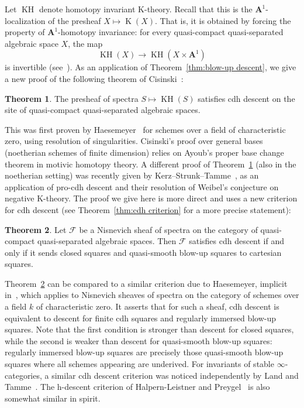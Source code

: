\documentclass[11pt]{article}
\theoremstyle{definition}
\numberwithin{equation}{section}
\numberwithin{figure}{section}
\numberwithin{table}{section}
\newtheorem{thmX}{Theorem}
\newcommand{\sF}{\ensuremath{\mathcal{F}}\xspace}
\newcommand{\bA}{\ensuremath{\mathbf{A}}\xspace}
\newcommand{\A}{\bA}
\DeclareMathOperator{\K}{K}
\DeclareMathOperator{\KH}{KH}
\begin{document}
Let $\KH$ denote homotopy invariant K-theory. Recall that this is the $\A^1$-localization of the presheaf $X \mapsto \K(X)$. That is, it is obtained by forcing the property of $\A^1$-homotopy invariance: for every quasi-compact quasi-separated algebraic space $X$, the map
\[
\KH(X) \to \KH\left(X \times \A^1\right)
\]
is invertible (see~\cite{CisinskiKH,WeibelKH}). As an application of Theorem~\ref{thm:blow-up descent}, we give a new proof of the following theorem of Cisinski~\cite{CisinskiKH}:

\begin{thmX}\label{thm:KH cdh descent}
The presheaf of spectra $S \mapsto \KH(S)$ satisfies cdh descent on the site of quasi-compact quasi-separated algebraic spaces.
\end{thmX}

This was first proven by Haesemeyer~\cite{Haesemeyer} for schemes over a field of characteristic zero, using resolution of singularities. Cisinski's proof over general bases (noetherian schemes of finite dimension) relies on Ayoub's proper base change theorem in motivic homotopy theory. A different proof of Theorem~\ref{thm:KH cdh descent} (also in the noetherian setting) was recently given by Kerz--Strunk--Tamme~\cite[Theorem~C]{KerzStrunkTamme}, as an application of pro-cdh descent and their resolution of Weibel's conjecture on negative K-theory. The proof we give here is more direct and uses a new criterion for cdh descent (see Theorem~\ref{thm:cdh criterion} for a more precise statement):

\begin{thmX}\label{thm:cdh intro}
Let $\sF$ be a Nisnevich sheaf of spectra on the category of quasi-compact quasi-separated algebraic spaces. Then $\sF$ satisfies cdh descent if and only if it sends closed squares and quasi-smooth blow-up squares to cartesian squares.
\end{thmX}

Theorem~\ref{thm:cdh intro} can be compared to a similar criterion due to Haesemeyer, implicit in~\cite{Haesemeyer}, which applies to Nisnevich sheaves of spectra on the category of schemes over a field $k$ of characteristic zero. It asserts that for such a sheaf, cdh descent is equivalent to descent for finite cdh squares and regularly immersed blow-up squares. Note that the first condition is stronger than descent for closed squares, while the second is weaker than descent for quasi-smooth blow-up squares: regularly immersed blow-up squares are precisely those quasi-smooth blow-up squares where all schemes appearing are underived. For invariants of stable $\infty$-categories, a similar cdh descent criterion was noticed independently by Land and Tamme~\cite[Theorem.~A.2]{LandTamme}. The h-descent criterion of Halpern-Leistner and Preygel~\cite[Proposition~3.2.1]{HalpernLeistnerPreygel} is also somewhat similar in spirit.
\end{document}
